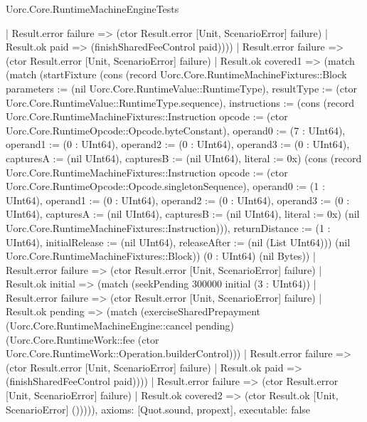 \begin{lexlean}{Uorc.Core.RuntimeMachineEngineTests}
\begin{semanticmodule}
{            | Result.error failure => (ctor Result.error [Unit, ScenarioError] failure)
            | Result.ok paid => (finishSharedFeeControl paid))))
      | Result.error failure => (ctor Result.error [Unit, ScenarioError] failure)
      | Result.ok covered1 => (match (match (startFixture (cons (record Uorc.Core.RuntimeMachineFixtures::Block {parameters := (nil Uorc.Core.RuntimeValue::RuntimeType), resultType := (ctor Uorc.Core.RuntimeValue::RuntimeType.sequence), instructions := (cons (record Uorc.Core.RuntimeMachineFixtures::Instruction {opcode := (ctor Uorc.Core.RuntimeOpcode::Opcode.byteConstant), operand0 := (7 : UInt64), operand1 := (0 : UInt64), operand2 := (0 : UInt64), operand3 := (0 : UInt64), capturesA := (nil UInt64), capturesB := (nil UInt64), literal := 0x}) (cons (record Uorc.Core.RuntimeMachineFixtures::Instruction {opcode := (ctor Uorc.Core.RuntimeOpcode::Opcode.singletonSequence), operand0 := (1 : UInt64), operand1 := (0 : UInt64), operand2 := (0 : UInt64), operand3 := (0 : UInt64), capturesA := (nil UInt64), capturesB := (nil UInt64), literal := 0x}) (nil Uorc.Core.RuntimeMachineFixtures::Instruction))), returnDistance := (1 : UInt64), initialRelease := (nil UInt64), releaseAfter := (nil (List UInt64))}) (nil Uorc.Core.RuntimeMachineFixtures::Block)) (0 : UInt64) (nil Bytes))
          | Result.error failure => (ctor Result.error [Unit, ScenarioError] failure)
          | Result.ok initial => (match (seekPending 300000 initial (3 : UInt64))
            | Result.error failure => (ctor Result.error [Unit, ScenarioError] failure)
            | Result.ok pending => (match (exerciseSharedPrepayment (Uorc.Core.RuntimeMachineEngine::cancel pending) (Uorc.Core.RuntimeWork::fee (ctor Uorc.Core.RuntimeWork::Operation.builderControl)))
              | Result.error failure => (ctor Result.error [Unit, ScenarioError] failure)
              | Result.ok paid => (finishSharedFeeControl paid))))
        | Result.error failure => (ctor Result.error [Unit, ScenarioError] failure)
        | Result.ok covered2 => (ctor Result.ok [Unit, ScenarioError] ())))),
  axioms: [Quot.sound, propext],
  executable: false
}


\end{semanticmodule}
\end{lexlean}
